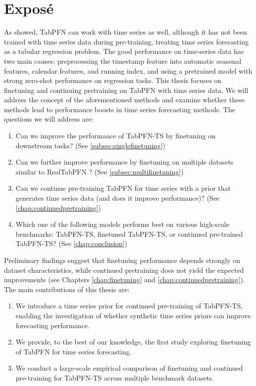 \section{Exposé}
\label{sec:expose}
As \citet{hoo2025tables} showed, TabPFN can work with time series as well, although it has not been trained with time series data during pre-training, treating time series forecasting as a tabular regression problem.
The good performance on time-series data has two main causes: preprocessing the timestamp feature into automatic seasonal features, calendar features, and running index, and using a pretrained model with strong zero-shot performance on regression tasks. \newline
This thesis focuses on finetuning and continuing pretraining on TabPFN with time series data.
We will address the concept of the aforementioned methods and examine whether these methods lead to performance boosts in time series forecasting methods.
\newline
The questions we will address are:
\begin{enumerate}
    \item Can we improve the performance of TabPFN-TS by finetuning on downstream tasks? (See \autoref{subsec:singlefinetuning})
    \item Can we further improve performance by finetuning on multiple datasets similar to RealTabPFN \citep{Hollmann_2025}? (See \autoref{subsec:multifinetuning})
    \item Can we continue pre-training TabPFN for time series with a prior that generates time series data (and does it improve performance)? (See \autoref{chap:continuedpretraining})
    \item Which one of the following models performs best on various high-scale benchmarks: TabPFN-TS, finetuned TabPFN-TS, or continued pre-trained TabPFN-TS? (See \autoref{chap:conclusion})
\end{enumerate}
Preliminary findings suggest that finetuning performance depends strongly on dataset characteristics, while continued pretraining does not yield the expected improvements (see Chapters \ref{chap:finetuning} and \ref{chap:continuedpretraining}).
\newline
The main contributions of this thesis are:
\begin{enumerate}
    \item We introduce a time series prior for continued pre-training of TabPFN-TS, enabling the investigation of whether synthetic time series priors can improve forecasting performance.
    \item We provide, to the best of our knowledge, the first study exploring finetuning of TabPFN for time series forecasting.
    \item We conduct a large-scale empirical comparison of finetuning and continued pre-training for TabPFN-TS across multiple benchmark datasets.
\end{enumerate}
